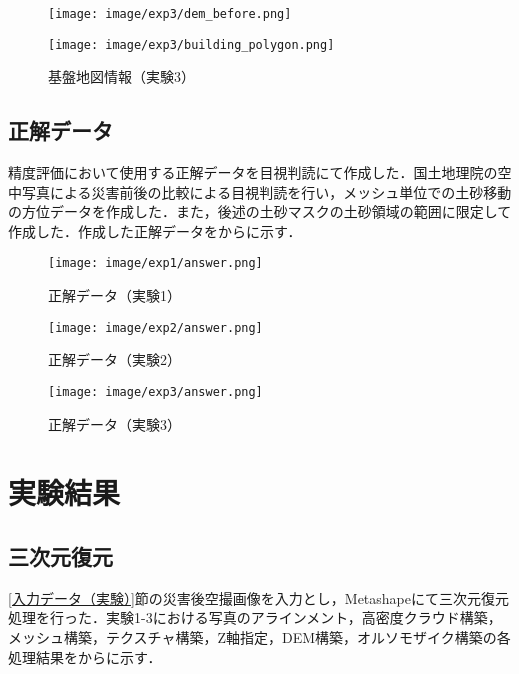       \begin{figure}[tbp]
        \begin{minipage}[c]{0.5\hsize}
          \centering
          \texttt{[image: image/exp3/dem\_before.png]}
        \end{minipage}
        \begin{minipage}[c]{0.5\hsize}
          \centering
          \texttt{[image: image/exp3/building\_polygon.png]}
        \end{minipage}
        \caption{基盤地図情報（実験3）}
        \label{基盤地図情報（実験3）}
      \end{figure}


    \subsection*{正解データ}
      精度評価において使用する正解データを目視判読にて作成した．国土地理院の空中写真による災害前後の比較\cite{国土地理院空撮画像1, 国土地理院空撮画像2}による目視判読を行い，メッシュ単位での土砂移動の方位データを作成した．また，後述の土砂マスクの土砂領域の範囲に限定して作成した．作成した正解データをからに示す．

      \begin{figure}[tbp]
        \centering
        \texttt{[image: image/exp1/answer.png]}
        \caption{正解データ（実験1）}
        \label{正解データ（実験1）}
      \end{figure}

      \begin{figure}[tbp]
        \centering
        \texttt{[image: image/exp2/answer.png]}
        \caption{正解データ（実験2）}
      \end{figure}

      \begin{figure}[tbp]
        \centering
        \texttt{[image: image/exp3/answer.png]}
        \caption{正解データ（実験3）}
        \label{正解データ（実験3）}
      \end{figure}


  \section{実験結果}
    \label{実験結果}
    \subsection*{三次元復元}
      \ref{入力データ（実験）}節の災害後空撮画像を入力とし，Metashapeにて三次元復元処理を行った．実験1-3における写真のアラインメント，高密度クラウド構築，メッシュ構築，テクスチャ構築，Z軸指定，DEM構築，オルソモザイク構築の各処理結果をからに示す．

